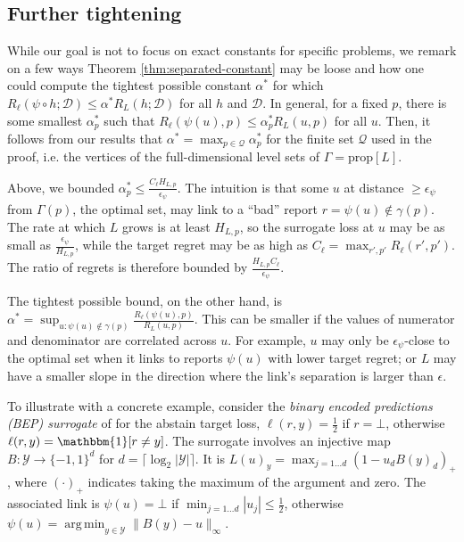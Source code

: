 \documentclass{article}
\theoremstyle{definition}\newtheorem{definition}{Definition}
\theoremstyle{definition}\newtheorem{assumption}{Assumption}
\DeclareMathOperator*{\argmin}{arg\,min}
\newcommand{\prop}[1]{\mathrm{prop}[#1]}
\newcommand{\D}{\mathcal{D}}
\newcommand{\Y}{\mathcal{Y}}
\newcommand{\ones}{\mathbbm{1}}
\begin{document}
\subsection{Further tightening}
While our goal is not to focus on exact constants for specific problems, we remark on a few ways Theorem \ref{thm:separated-constant} may be loose and how one could compute the tightest possible constant $\alpha^*$ for which $R_{\ell}(\psi \circ h;\D) \leq \alpha^* R_L(h;\D)$ for all $h$ and $\D$.
In general, for a fixed $p$, there is some smallest $\alpha_p^*$ such that $R_{\ell}(\psi(u),p) \leq \alpha_p^* R_L(u,p)$ for all $u$.
Then, it follows from our results that $\alpha^* = \max_{p \in \mathcal{Q}} \alpha_p^*$ for the finite set $\mathcal{Q}$ used in the proof, i.e. the vertices of the full-dimensional level sets of $\Gamma = \prop{L}$.

Above, we bounded $\alpha_p^* \leq \frac{C_{\ell} H_{L,p}}{\epsilon_{\psi}}$.
The intuition is that some $u$ at distance $\geq \epsilon_{\psi}$ from $\Gamma(p)$, the optimal set, may link to a ``bad'' report $r = \psi(u) \not\in \gamma(p)$.
The rate at which $L$ grows is at least $H_{L,p}$, so the surrogate loss at $u$ may be as small as $\frac{\epsilon_{\psi}}{H_{L,p}}$, while the target regret may be as high as $C_{\ell} = \max_{r',p'} R_{\ell}(r',p')$.
The ratio of regrets is therefore bounded by $\frac{H_{L,p} C_{\ell}}{\epsilon_{\psi}}$.

The tightest possible bound, on the other hand, is $\alpha^* = \sup_{u: \psi(u) \not\in \gamma(p)} \frac{R_{\ell}(\psi(u),p)}{R_L(u,p)}$.
This can be smaller if the values of numerator and denominator are correlated across $u$.
For example, $u$ may only be $\epsilon_{\psi}$-close to the optimal set when it links to reports $\psi(u)$ with lower target regret; or $L$ may have a smaller slope in the direction where the link's separation is larger than $\epsilon$.

To illustrate with a concrete example, consider the \emph{binary encoded predictions (BEP) surrogate} of \cite{ramaswamy2018consistent} for the abstain target loss, $\ell(r,y) = \frac{1}{2}$ if $r = \bot$, otherwise $\ell(r,y) = \ones[r \neq y]$.
The surrogate involves an injective map $B: \Y \to \{-1,1\}^d$ for $d = \lceil \log_2 |\Y| \rceil$.
It is $L(u)_y = \max_{j=1\dots d} (1 - u_d B(y)_d)_+$, where $(\cdot)_+$ indicates taking the maximum of the argument and zero.
The associated link is $\psi(u) = \bot$ if $\min_{j=1\dots d} |u_j| \leq \tfrac{1}{2}$, otherwise $\psi(u) = \argmin_{y \in \Y} \|B(y) - u\|_{\infty}$.
\end{document}
